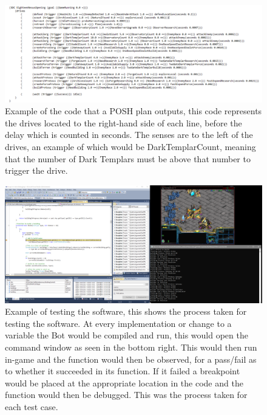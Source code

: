 \documentclass[journal]{IEEEtran}
\begin{document}
	\begin{figure}
		\centering
		\includegraphics[width=\textwidth]{PlanCode}
		\caption{Example of the code that a POSH plan outputs, this code represents the drives located to the right-hand side of each line, before the delay which is counted in seconds. The senses are to the left of the drives, an example of which would be DarkTemplarCount, meaning that the number of Dark Templars must be above that number to trigger the drive.}
		\label{figure10}
	\end{figure}
	\begin{figure}
		\centering
		\includegraphics[width=\textwidth]{Testing}
		\caption{Example of testing the software, this shows the process taken for testing the software. At every implementation or change to a variable the Bot would be compiled and run, this would open the command window as seen in the bottom right. This would then run in-game and the function would then be observed, for a pass/fail as to whether it succeeded in its function. If it failed a breakpoint would be placed at the appropriate location in the code and the function would then be debugged. This was the process taken for each test case.}
		\label{figure11}
	\end{figure}
	
\end{document}
